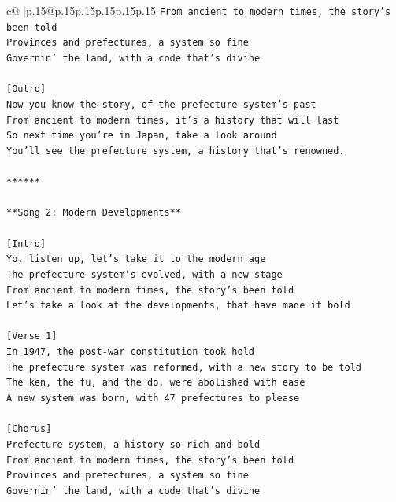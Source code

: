 \documentclass{article}
\begin{document}
{\begin{supertabular}{c@{$\;$}|p{.15\linewidth}@{}p{.15\linewidth}p{.15\linewidth}p{.15\linewidth}p{.15\linewidth}p{.15\linewidth}}
{{{\texttt{From ancient to modern times, the story's been told} \\
\texttt{Provinces and prefectures, a system so fine} \\
\texttt{Governin' the land, with a code that's divine} \\
\\ 
\texttt{{[}Outro{]}} \\
\texttt{Now you know the story, of the prefecture system's past} \\
\texttt{From ancient to modern times, it's a history that will last} \\
\texttt{So next time you're in Japan, take a look around} \\
\texttt{You'll see the prefecture system, a history that's renowned.} \\
\\ 
\texttt{******} \\
\\ 
\texttt{**Song 2: Modern Developments**} \\
\\ 
\texttt{{[}Intro{]}} \\
\texttt{Yo, listen up, let's take it to the modern age} \\
\texttt{The prefecture system's evolved, with a new stage} \\
\texttt{From ancient to modern times, the story's been told} \\
\texttt{Let's take a look at the developments, that have made it bold} \\
\\ 
\texttt{{[}Verse 1{]}} \\
\texttt{In 1947, the post{-}war constitution took hold} \\
\texttt{The prefecture system was reformed, with a new story to be told} \\
\texttt{The ken, the fu, and the dō, were abolished with ease} \\
\texttt{A new system was born, with 47 prefectures to please} \\
\\ 
\texttt{{[}Chorus{]}} \\
\texttt{Prefecture system, a history so rich and bold} \\
\texttt{From ancient to modern times, the story's been told} \\
\texttt{Provinces and prefectures, a system so fine} \\
\texttt{Governin' the land, with a code that's divine} \\
}}}
\end{supertabular}}
\end{document}
